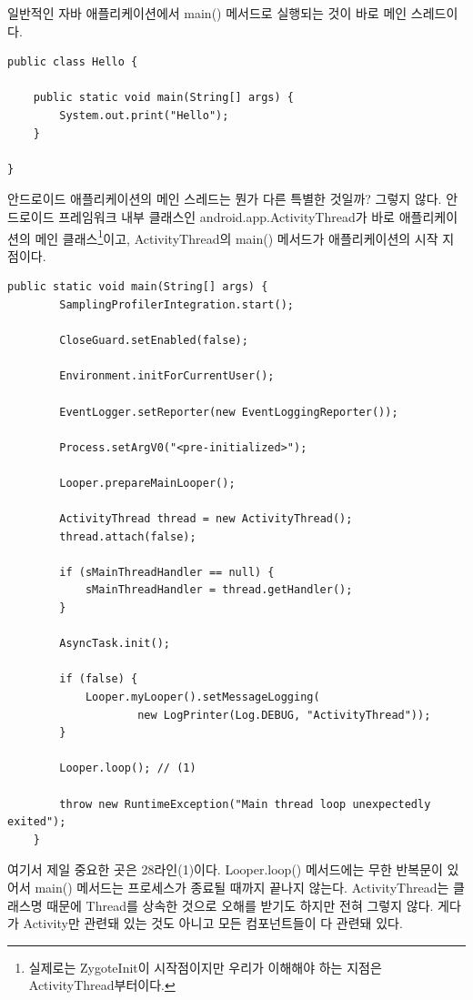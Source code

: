 일반적인 자바 애플리케이션에서 main() 메서드로 실행되는 것이 바로 메인 스레드이다.
\begin{lstlisting}[frame=single] 
public class Hello {

	public static void main(String[] args) {
		System.out.print("Hello");
	}

}
\end{lstlisting}

안드로이드 애플리케이션의 메인 스레드는 뭔가 다른 특별한 것일까? 그렇지 않다. 
안드로이드 프레임워크 내부 클래스인 android.app.ActivityThread가 바로 애플리케이션의 메인 클래스\footnote{실제로는 ZygoteInit이 시작점이지만 우리가 이해해야 하는 지점은 ActivityThread부터이다.}이고, ActivityThread의 main() 메서드가 애플리케이션의 시작 지점이다.

\begin{lstlisting}[frame=single, caption=ActivityThread.java] 
	public static void main(String[] args) {
		SamplingProfilerIntegration.start();

		CloseGuard.setEnabled(false);

		Environment.initForCurrentUser();

		EventLogger.setReporter(new EventLoggingReporter());

		Process.setArgV0("<pre-initialized>");

		Looper.prepareMainLooper();

		ActivityThread thread = new ActivityThread();
		thread.attach(false);

		if (sMainThreadHandler == null) {
			sMainThreadHandler = thread.getHandler();
		}

		AsyncTask.init();

		if (false) {
			Looper.myLooper().setMessageLogging(
					new LogPrinter(Log.DEBUG, "ActivityThread"));
		}

		Looper.loop(); // (1)

		throw new RuntimeException("Main thread loop unexpectedly exited");
	}
\end{lstlisting}

여기서 제일 중요한 곳은 28라인(1)이다. 
Looper.loop() 메서드에는 무한 반복문이 있어서 main() 메서드는 프로세스가 종료될 때까지 끝나지 않는다.
ActivityThread는 클래스명 때문에 Thread를 상속한 것으로 오해를 받기도 하지만 전혀 그렇지 않다.
게다가 Activity만 관련돼 있는 것도 아니고 모든 컴포넌트들이 다 관련돼 있다.


